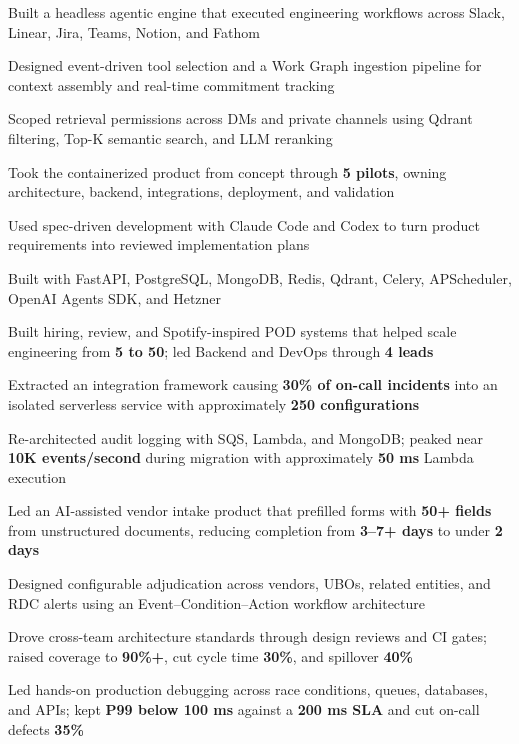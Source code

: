 
\begin{cvitems}
  \item Built a headless agentic engine that executed engineering workflows across Slack, Linear, Jira, Teams, Notion, and Fathom
  \item Designed event-driven tool selection and a Work Graph ingestion pipeline for context assembly and real-time commitment tracking
  \item Scoped retrieval permissions across DMs and private channels using Qdrant filtering, Top-K semantic search, and LLM reranking
  \item Took the containerized product from concept through \textbf{5 pilots}, owning architecture, backend, integrations, deployment, and validation
  \item Used spec-driven development with Claude Code and Codex to turn product requirements into reviewed implementation plans
  \item Built with FastAPI, PostgreSQL, MongoDB, Redis, Qdrant, Celery, APScheduler, OpenAI Agents SDK, and Hetzner
\end{cvitems}

\begin{cvitems}
  \item Built hiring, review, and Spotify-inspired POD systems that helped scale engineering from \textbf{5 to 50}; led Backend and DevOps through \textbf{4 leads}
  \item Extracted an integration framework causing \textbf{30\% of on-call incidents} into an isolated serverless service with approximately \textbf{250 configurations}
  \item Re-architected audit logging with SQS, Lambda, and MongoDB; peaked near \textbf{10K events/second} during migration with approximately \textbf{50 ms} Lambda execution
  \item Led an AI-assisted vendor intake product that prefilled forms with \textbf{50+ fields} from unstructured documents, reducing completion from \textbf{3--7+ days} to under \textbf{2 days}
  \item Designed configurable adjudication across vendors, UBOs, related entities, and RDC alerts using an Event--Condition--Action workflow architecture
  \item Drove cross-team architecture standards through design reviews and CI gates; raised coverage to \textbf{90\%+}, cut cycle time \textbf{30\%}, and spillover \textbf{40\%}
  \item Led hands-on production debugging across race conditions, queues, databases, and APIs; kept \textbf{P99 below 100 ms} against a \textbf{200 ms SLA} and cut on-call defects \textbf{35\%}
\end{cvitems}

